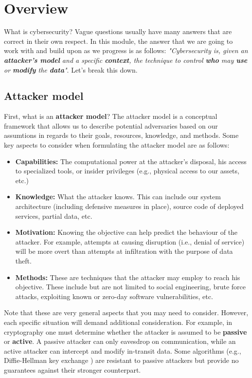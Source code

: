 \section{Overview}

What is cybersecurity? Vague questions usually have many answers that are
correct in their own respect. In this module, the answer that we are going to
work with and build upon as we progress is as follows: \textit{"Cybersecurity
is, given an \textbf{attacker's model} and a specific \textbf{context}, the
technique to control \textbf{who} may \textbf{use} or \textbf{modify} the
\textbf{data}"}. Let's break this down.

\subsection{Attacker model}

First, what is an \textbf{attacker model}? The attacker model is a conceptual
framework that allows us to describe potential adversaries based on our
assumtions in regards to their goals, resources, knowledge, and methods. Some
key aspects to consider when formulating the attacker model are as follows:

\begin{itemize}
    \item \textbf{Capabilities:} The computational power at the attacker's
          disposal, his access to specialized tools, or insider privileges
          (e.g., physical access to our assets, etc.)
    \item \textbf{Knowledge:} What the attacker knows. This can include our
          system architecture (including defensive measures in place), source
          code of deployed services, partial data, etc.
    \item \textbf{Motivation:} Knowing the objective can help predict the
          behaviour of the attacker. For example, attempts at causing disruption
          (i.e., denial of service) will be more overt than attempts at
          infiltration with the purpose of data theft.
    \item \textbf{Methods:} These are techniques that the attacker may employ to
          reach his objective. These include but are not limited to social
          engineering, brute force attacks, exploiting known or zero-day
          software vulnerabilities, etc.
\end{itemize}

Note that these are very general aspects that you may need to consider. However,
each specific situation will demand additional consideration. For example, in
cryptography one must determine whether the attacker is assumed to be
\textbf{passive} or \textbf{active}. A passive attacker can only eavesdrop on
communication, while an active attacker can intercept and modify in-transit
data. Some algorithms (e.g., Diffie-Hellman key exchange
\cite{mitra2021prevention}) are resistant to passive attackers but provide no
guarantees against their stronger counterpart.

